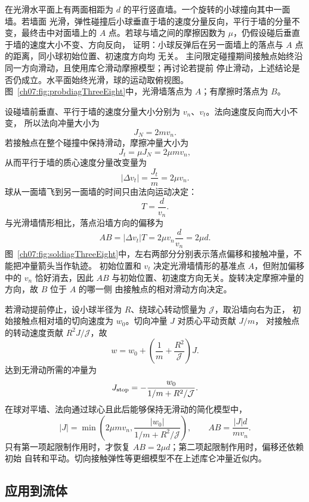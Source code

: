 {
\begin{origexamplebox}{}\label{ch07:ex:s07-3-8}
在光滑水平面上有两面相距为 $d$ 的平行竖直墙。一个旋转的小球撞向其中一面墙。若墙面
光滑，弹性碰撞后小球垂直于墙的速度分量反向，平行于墙的分量不变，最终击中对面墙上的
$A$ 点。若球与墙之间的摩擦因数为 $\mu$，仍假设碰后垂直于墙的速度大小不变、方向反向，
证明：小球反弹后在另一面墙上的落点与 $A$ 点的距离，同小球初始位置、初速度方向均
无关。
主问限定碰撞期间接触点始终沿同一方向滑动，且使用库仑滑动摩擦模型；再讨论若提前
停止滑动，上述结论是否仍成立。水平面始终光滑，球的运动取俯视图。
图~\ref{ch07:fig:probdiagThreeEight}中，光滑墙落点为 $A$；有摩擦时落点为 $B$。
\probdiagThreeEight
\end{origexamplebox}

\begin{xesolution}
设碰墙前垂直、平行于墙的速度分量大小分别为 $v_n$、$v_t$。法向速度反向而大小不变，
所以法向冲量大小为
\[
 J_N=2mv_n.
\]
若接触点在整个碰撞中保持滑动，摩擦冲量大小为
\[
 J_t=\mu J_N=2\mu mv_n,
\]
从而平行于墙的质心速度分量改变量为
\[
 |\Delta v_t|=\frac{J_t}{m}=2\mu v_n.
\]
球从一面墙飞到另一面墙的时间只由法向运动决定：
\[
 T=\frac{d}{v_n}.
\]
与光滑墙情形相比，落点沿墙方向的偏移为
\[
 AB=|\Delta v_t|T=2\mu v_n\frac{d}{v_n}
 =\boxed{2\mu d}.
\]
图~\ref{ch07:fig:soldiagThreeEight}中，左右两部分分别表示落点偏移和接触冲量，不能把冲量箭头当作轨迹。
\soldiagThreeEight
初始位置和 $v_t$ 决定光滑墙情形的基准点 $A$，但附加偏移中的 $v_n$ 恰好消去，因此
$AB$ 与初始位置、初速度方向无关。旋转决定摩擦冲量的方向，故 $B$ 位于 $A$ 的哪一侧
由接触点的相对滑动方向决定。

若滑动提前停止，设小球半径为 $R$、绕球心转动惯量为 $\mathcal J$，取沿墙向右为正，
初始接触点相对墙的切向速度为 $w_0$。切向冲量 $J$ 对质心平动贡献 $J/m$，
对接触点的转动速度贡献 $R^2J/\mathcal J$，故
\[
 w=w_0+\left(\frac1m+\frac{R^2}{\mathcal J}\right)J.
\]
达到无滑动所需的冲量为
\[
 J_{\rm stop}=-\frac{w_0}{1/m+R^2/\mathcal J}.
\]
在球对平墙、法向通过球心且此后能够保持无滑动的简化模型中，
\[
 |J|=\min\left(2\mu m v_n,\frac{|w_0|}{1/m+R^2/\mathcal J}\right),
 \qquad AB=\frac{|J|d}{mv_n}.
\]
只有第一项起限制作用时，才恢复 $AB=2\mu d$；第二项起限制作用时，偏移还依赖初始
自转和平动。切向接触弹性等更细模型不在上述库仑冲量近似内。
\end{xesolution}

\subsection{应用到流体}

}
